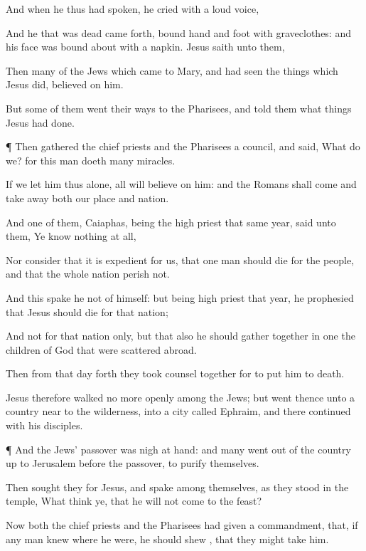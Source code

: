 {And when
he
thus had
spoken, he
cried with
a
loud
voice,
{}

And he that was
dead came
forth,
bound
hand
and
foot
with
graveclothes:
and
his
face was bound about
with a
napkin.
Jesus
saith unto
them,
{}

Then
many
of the
Jews which
came
to
Mary,
and had
seen the things
which
Jesus
did,
believed
on
him.

But
some
of
them went their
ways
to the
Pharisees,
and
told
them what
things
Jesus had
done.


\par }{\PP {}¶
Then
gathered the chief
priests
and the
Pharisees a
council,
and
said,
What do
we?
for
this
man
doeth
many
miracles.

If we
let
him thus
alone,
all
{} will
believe
on
him:
and the
Romans shall
come
and take
away
both
our
place
and
nation.

And
one
of
them,
{}
Caiaphas,
being the high
priest that
same
year,
said unto
them,
Ye
know
nothing at
all,

Nor
consider
that it is
expedient for
us,
that
one
man should
die
for the
people,
and
that the
whole
nation
perish
not.

And
this spake
he
not
of
himself:
but
being high
priest
that
year, he
prophesied
that
Jesus
should
die
for that
nation;

And
not
for that
nation
only,
but
that
also he should gather
together
in
one the
children of
God that were scattered
abroad.

Then
from
that
day
forth they took counsel
together
for to
put
him to
death.

Jesus
therefore
walked
no
more
openly
among the
Jews;
but
went
thence
unto a
country near
to the
wilderness,
into a
city
called
Ephraim, and
there
continued
with
his
disciples.


\par }{\PP {}¶
And the
Jews’
passover
was nigh at
hand:
and
many
went out
of the
country up
to
Jerusalem
before the
passover,
to
purify
themselves.

Then sought
they for
Jesus,
and
spake
among
themselves, as they
stood
in the
temple,
What
think
ye,
that he
will
not
come
to the
feast?

Now
both the chief
priests
and the
Pharisees had
given a
commandment,
that,
if any
man
knew
where he
were, he should
shew
{},
that they might
take
him.




}
